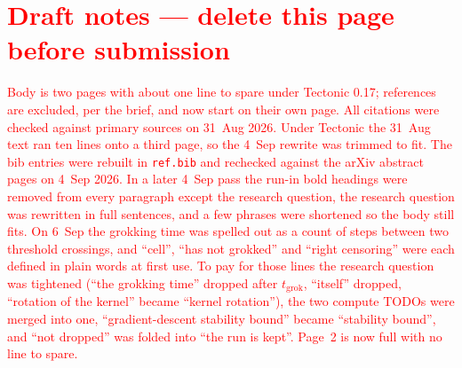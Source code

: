 \documentclass[a4paper,11pt]{article} %
\newcommand{\tgrok}{t_{\mathrm{grok}}}
\begin{document}
\clearpage
\smaller
\printbibliography

\clearpage
\section*{\textcolor{red}{Draft notes --- delete this page before submission}}
\textcolor{red}{Body is two pages with about one line to spare under
Tectonic 0.17; references are excluded, per the brief, and now start on their
own page. All citations were checked against primary sources on 31~Aug 2026.
Under Tectonic the 31~Aug text ran ten lines onto a third page, so the 4~Sep
rewrite was trimmed to fit. The bib entries were rebuilt in \texttt{ref.bib} and
rechecked against the arXiv abstract pages on 4~Sep 2026. In a later 4~Sep
pass the run-in bold headings were removed from every paragraph except the
research question, the research question was rewritten in full sentences, and
a few phrases were shortened so the body still fits. On 6~Sep the grokking
time was spelled out as a count of steps between two threshold crossings, and
``cell'', ``has not grokked'' and ``right censoring'' were each defined in
plain words at first use. To pay for those lines the research question was
tightened (``the grokking time'' dropped after $\tgrok$, ``itself'' dropped,
``rotation of the kernel'' became ``kernel rotation''), the two compute TODOs
were merged into one, ``gradient-descent stability bound'' became ``stability
bound'', and ``not dropped'' was folded into ``the run is kept''. Page~2 is
now full with no line to spare.}
\end{document}
